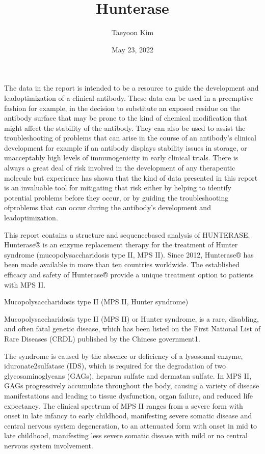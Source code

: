 \documentclass[letterpaper,10pt,english]{jupyterBook}
\title{Hunterase}
\date{May 23, 2022}
\author{Taeyoon Kim}
\begin{document}
\pagestyle{empty}
\sphinxmaketitle
\pagestyle{plain}
\sphinxtableofcontents
\pagestyle{normal}
\label{\detokenize{intro::doc}}


\sphinxAtStartPar
The data in the report is intended to be a resource to guide the development and lead\sphinxhyphen{}optimization of a clinical antibody. These data can be used in a preemptive fashion \sphinxhyphen{} for example, in the decision to substitute an exposed residue on the antibody surface that may be prone to the kind of chemical modification that might affect the stability of the antibody. They can also be used to assist the troubleshooting of problems that can arise in the course of an antibody’s clinical development \sphinxhyphen{} for example if an antibody displays stability issues in storage, or unacceptably high levels of immunogenicity in early clinical trials. There is always a great deal of risk involved in the development of any therapeutic molecule but experience has shown that the kind of data presented in this report is an invaluable tool for mitigating that risk \sphinxhyphen{} either by helping to identify potential problems before they occur, or by guiding the troubleshooting ofproblems that can occur during the antibody’s development and lead\sphinxhyphen{}optimization.

\begin{DUlineblock}{0em}
\item[] 
\end{DUlineblock}

\sphinxAtStartPar
This report contains a structure and sequence\sphinxhyphen{}based analysis of HUNTERASE. Hunterase® is an enzyme replacement therapy for the treatment of Hunter syndrome (mucopolysaccharidosis type II, MPS II). Since 2012, Hunterase® has been made available in more than ten countries worldwide. The established efficacy and safety of Hunterase® provide a unique treatment option to patients with MPS II.

\sphinxAtStartPar
Mucopolysaccharidosis type II (MPS II, Hunter syndrome)

\sphinxAtStartPar
Mucopolysaccharidosis type II (MPS II) or Hunter syndrome, is a rare, disabling, and often fatal genetic disease, which has been listed on the First National List of Rare Diseases (CRDL) published by the Chinese government1.

\sphinxAtStartPar
The syndrome is caused by the absence or deficiency of a lysosomal enzyme, iduronate\sphinxhyphen{}2\sphinxhyphen{}sulfatase (IDS), which is required for the degradation of two glycosaminoglycans (GAGs), heparan sulfate and dermatan sulfate. In MPS II, GAGs progressively accumulate throughout the body, causing a variety of disease manifestations and leading to tissue dysfunction, organ failure, and reduced life expectancy. The clinical spectrum of MPS II ranges from a severe form with onset in late infancy to early childhood, manifesting severe somatic disease and central nervous system degeneration, to an attenuated form with onset in mid to late childhood, manifesting less severe somatic disease with mild or no central nervous system involvement.
\end{document}
